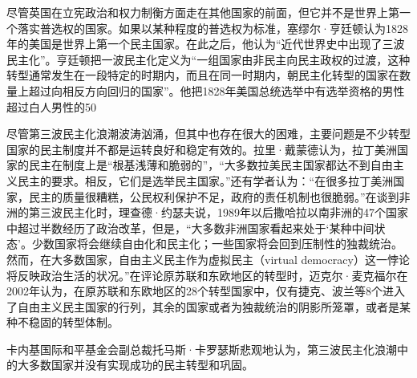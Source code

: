 尽管英国在立宪政治和权力制衡方面走在其他国家的前面，但它并不是世界上第一个落实普选权的国家。如果以某种程度的普选权为标准，塞缪尔·亨廷顿认为1828年的美国是世界上第一个民主国家。在此之后，他认为“近代世界史中出现了三波民主化”。亨廷顿把一波民主化定义为“一组国家由非民主向民主政权的过渡，这种转型通常发生在一段特定的时期内，而且在同一时期内，朝民主化转型的国家在数量上超过向相反方向回归的国家”。他把1828年美国总统选举中有选举资格的男性超过白人男性的50%

尽管第三波民主化浪潮波涛汹涌，但其中也存在很大的困难，主要问题是不少转型国家的民主制度并不都是运转良好和稳定有效的。拉里·戴蒙德认为，拉丁美洲国家的民主在制度上是“根基浅薄和脆弱的”，“大多数拉美民主国家都达不到自由主义民主的要求。相反，它们是选举民主国家。”还有学者认为：“在很多拉丁美洲国家，民主的质量很糟糕，公民权利保护不足，政府的责任机制也很脆弱。”在谈到非洲的第三波民主化时，理查德·约瑟夫说，1989年以后撒哈拉以南非洲的47个国家中超过半数经历了政治改革，但是，“大多数非洲国家看起来处于‘某种中间状态’。少数国家将会继续自由化和民主化；一些国家将会回到压制性的独裁统治。然而，在大多数国家，自由主义民主作为虚拟民主（virtual democracy）这一悖论将反映政治生活的状况。”在评论原苏联和东欧地区的转型时，迈克尔·麦克福尔在2002年认为，在原苏联和东欧地区的28个转型国家中，仅有捷克、波兰等8个进入了自由主义民主国家的行列，其余的国家或者为独裁统治的阴影所笼罩，或者是某种不稳固的转型体制。

卡内基国际和平基金会副总裁托马斯·卡罗瑟斯悲观地认为，第三波民主化浪潮中的大多数国家并没有实现成功的民主转型和巩固。

